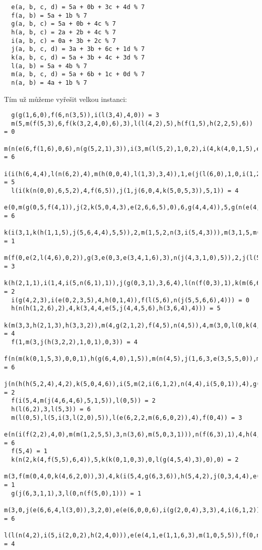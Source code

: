 \documentclass{fkssolpub}
\begin{document}
\begin{verbatim}
  e(a, b, c, d) = 5a + 0b + 3c + 4d % 7
  f(a, b) = 5a + 1b % 7
  g(a, b, c) = 5a + 0b + 4c % 7
  h(a, b, c) = 2a + 2b + 4c % 7
  i(a, b, c) = 0a + 3b + 2c % 7
  j(a, b, c, d) = 3a + 3b + 6c + 1d % 7
  k(a, b, c, d) = 5a + 3b + 4c + 3d % 7
  l(a, b) = 5a + 4b % 7
  m(a, b, c, d) = 5a + 6b + 1c + 0d % 7
  n(a, b) = 4a + 1b % 7
\end{verbatim}

Tím už můžeme vyřešit velkou instanci:

\begin{lstlisting}
  g(g(1,6,0),f(6,n(3,5)),i(l(3,4),4,0)) = 3
  m(5,m(f(5,3),6,f(k(3,2,4,0),6),3),l(l(4,2),5),h(f(1,5),h(2,2,5),6)) = 0
  m(n(e(6,f(1,6),0,6),n(g(5,2,1),3)),i(3,m(l(5,2),1,0,2),i(4,k(4,0,1,5),e(5,3,5,6))),n(2,n(l(5,0),3)),m(m(5,5,0,5),j(2,3,3,1),f(5,2),0)) = 6
  i(i(h(6,4,4),l(n(6,2),4),m(h(0,0,4),l(1,3),3,4)),1,e(j(l(6,0),1,0,i(1,2,1)),k(2,4,2,5),e(m(2,3,4,2),k(2,5,1,5),g(0,3,1),4),6)) = 5
  l(i(k(n(0,0),6,5,2),4,f(6,5)),j(1,j(6,0,4,k(5,0,5,3)),5,1)) = 4
  e(0,m(g(0,5,f(4,1)),j(2,k(5,0,4,3),e(2,6,6,5),0),6,g(4,4,4)),5,g(n(e(4,3,0,0),0),1,4)) = 6
  k(i(3,1,k(h(1,1,5),j(5,6,4,4),5,5)),2,m(1,5,2,n(3,i(5,4,3))),m(3,1,5,m(e(5,1,3,0),4,h(4,3,4),6))) = 1
  m(f(0,e(2,l(4,6),0,2)),g(3,e(0,3,e(3,4,1,6),3),n(j(4,3,1,0),5)),2,j(l(5,3),6,i(5,3,0),6)) = 3
  k(h(2,1,1),i(1,4,i(5,n(6,1),1)),j(g(0,3,1),3,6,4),l(n(f(0,3),1),k(m(6,6,5,4),5,0,0))) = 2
  i(g(4,2,3),i(e(0,2,3,5),4,h(0,1,4)),f(l(5,6),n(j(5,5,6,6),4))) = 0
  h(n(h(1,2,6),2),4,k(3,4,4,e(5,j(4,4,5,6),h(3,6,4),4))) = 5
  k(m(3,3,h(2,1,3),h(3,3,2)),m(4,g(2,1,2),f(4,5),n(4,5)),4,m(3,0,l(0,k(4,4,1,1)),l(l(1,0),4))) = 4
  f(1,m(3,j(h(3,2,2),1,0,1),0,3)) = 4
  f(n(m(k(0,1,5,3),0,0,1),h(g(6,4,0),1,5)),m(n(4,5),j(1,6,3,e(3,5,5,0)),m(1,5,0,2),4)) = 6
  j(n(h(h(5,2,4),4,2),k(5,0,4,6)),i(5,m(2,i(6,1,2),n(4,4),i(5,0,1)),4),g(g(2,1,h(6,1,5)),g(i(2,3,1),2,n(5,6)),3),g(l(k(0,0,3,6),0),3,l(e(2,0,4,3),g(1,0,0)))) = 2
  f(i(5,4,m(j(4,6,4,6),5,1,5)),l(0,5)) = 2
  h(l(6,2),3,l(5,3)) = 6
  m(l(0,5),l(5,i(3,l(2,0),5)),l(e(6,2,2,m(6,6,0,2)),4),f(0,4)) = 3
  e(n(i(f(2,2),4,0),m(m(1,2,5,5),3,n(3,6),m(5,0,3,1))),n(f(6,3),1),4,h(4,2,e(4,1,5,m(2,0,2,1)))) = 6
  f(5,4) = 1
  k(n(2,k(4,f(5,5),6,4)),5,k(k(0,1,0,3),0,l(g(4,5,4),3),0),0) = 2
  m(3,f(m(0,4,0,k(4,6,2,0)),3),4,k(i(5,4,g(6,3,6)),h(5,4,2),j(0,3,4,4),e(2,5,0,h(6,2,5)))) = 1
  g(j(6,3,1,1),3,l(0,n(f(5,0),1))) = 1
  m(3,0,j(e(6,6,4,l(3,0)),3,2,0),e(e(6,0,0,6),i(g(2,0,4),3,3),4,i(6,1,2))) = 6
  l(l(n(4,2),i(5,i(2,0,2),h(2,4,0))),e(e(4,1,e(1,1,6,3),m(1,0,5,5)),f(0,n(0,6)),h(1,3,3),6)) = 4

\end{lstlisting}
\end{document}
